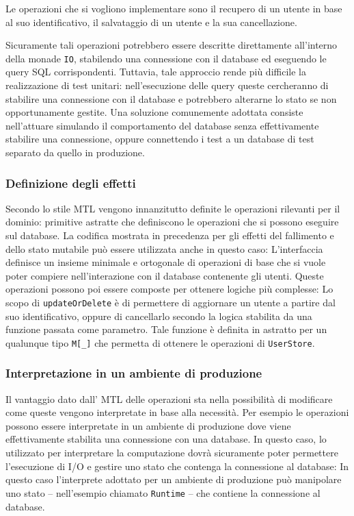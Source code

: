 Le operazioni che si vogliono implementare sono il recupero di un utente in base al suo identificativo, il salvataggio di un utente e la sua cancellazione.

Sicuramente tali operazioni potrebbero essere descritte direttamente all'interno della monade \lstinline{IO}, stabilendo una connessione con il database ed eseguendo le query SQL corrispondenti. Tuttavia, tale approccio rende più difficile la realizzazione di test unitari: nell'esecuzione delle query queste cercheranno di stabilire una connessione con il database e potrebbero alterarne lo stato se non opportunamente gestite. Una soluzione comunemente adottata consiste nell'attuare  simulando il comportamento del database senza effettivamente stabilire una connessione, oppure connettendo i test a un database di test separato da quello in produzione.

\subsubsection{Definizione degli effetti}
Secondo lo stile \ac{MTL} vengono innanzitutto definite le operazioni rilevanti per il dominio: primitive astratte che definiscono le operazioni che si possono eseguire sul database. La codifica mostrata in precedenza per gli effetti del fallimento e dello stato mutabile può essere utilizzata anche in questo caso:
L'interfaccia definisce un insieme minimale e ortogonale di operazioni di base che si vuole poter compiere nell'interazione con il database contenente gli utenti. Queste operazioni possono poi essere composte per ottenere logiche più complesse:
Lo scopo di \lstinline{updateOrDelete} è di permettere di aggiornare un utente a partire dal suo identificativo, oppure di cancellarlo secondo la logica stabilita da una funzione passata come parametro.
Tale funzione è definita in astratto per un qualunque tipo \lstinline{M[_]} che permetta di ottenere le operazioni di \lstinline{UserStore}.

\subsubsection{Interpretazione in un ambiente di produzione}
Il vantaggio dato dall' \ac{MTL} delle operazioni sta nella possibilità di modificare come queste vengono interpretate in base alla necessità.
Per esempio le operazioni possono essere interpretate in un ambiente di produzione dove viene effettivamente stabilita una connessione con una database. In questo caso, lo  utilizzato per interpretare la computazione dovrà sicuramente poter permettere l'esecuzione di I/O e gestire uno stato che contenga la connessione al database:
In questo caso l'interprete adottato per un ambiente di produzione può manipolare uno stato -- nell'esempio chiamato \lstinline{Runtime} -- che contiene la connessione al database.

